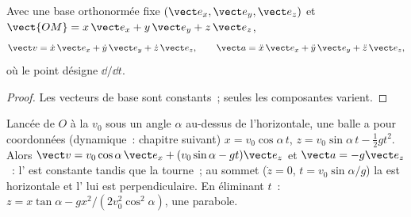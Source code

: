\begin{proposition}\label{prop:b1:point-kinematics:cartesian}
Avec une base orthonormée fixe $(\vect e_x, \vect e_y, \vect e_z)$ et
$\vect{OM} = x\,\vect e_x + y\,\vect e_y + z\,\vect e_z$,
\[
\vect v = \dot x\,\vect e_x + \dot y\,\vect e_y + \dot z\,\vect e_z, \qquad
\vect a = \ddot x\,\vect e_x + \ddot y\,\vect e_y + \ddot z\,\vect e_z,
\]
où le point désigne $\dd/\dd t$.
\end{proposition}

\begin{proof}
Les vecteurs de base sont constants~; seules les composantes varient.
\end{proof}

\begin{example}[Projectile]\label{ex:b1:point-kinematics:projectile}
Lancée de $O$ à la  $v_0$ sous un angle $\alpha$ au-dessus de
l'horizontale, une balle a pour coordonnées (dynamique~: chapitre
suivant) $x = v_0\cos\alpha\,t$, $z = v_0\sin\alpha\,t - \tfrac12 gt^2$. Alors
$\vect v = v_0\cos\alpha\,\vect e_x + (v_0\sin\alpha - gt)\vect e_z$ et
$\vect a = -g\vect e_z$~: l' est constante tandis que la
 tourne~; au sommet ($\dot z = 0$, $t = v_0\sin\alpha/g$) la
 est horizontale et l' lui est perpendiculaire. En
éliminant $t$~: $z = x\tan\alpha - gx^2/(2v_0^2\cos^2\alpha)$, une
parabole.
\end{example}

